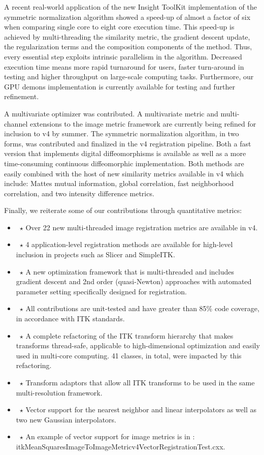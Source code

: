 \documentclass{frontiersSCNS}
\begin{document}
A recent real-world application of the new Insight ToolKit implementation of the symmetric normalization algorithm showed a speed-up of almost a factor of six when comparing single core to eight core execution time. This speed-up is achieved by multi-threading the similarity metric, the gradient descent update, the regularization terms and the composition components of the method. Thus, every essential step exploits intrinsic parallelism in the algorithm. Decreased execution time means more rapid turnaround for users, faster turn-around in testing and higher throughput on large-scale computing tasks.  Furthermore, our GPU demons implementation is currently available for testing and further refinement.

A multivariate optimizer was contributed. A multivariate metric and multi-channel extensions to the image metric framework are currently being refined for inclusion to v4 by summer. The symmetric normalization algorithm, in two forms, was contributed and finalized in the v4 registration pipeline. Both a fast version that implements digital diffeomorphisms is available as well as a more time-consuming continuous diffeomorphic implementation. Both methods are easily combined with the host of new similarity metrics available in v4 which include: Mattes mutual information, global correlation, fast neighborhood correlation, and two intensity difference metrics. 

Finally, we reiterate some of our contributions through quantitative metrics:
\begin{itemize}
\item~$\star$ Over 22 new multi-threaded image registration metrics are available in v4.
\item~$\star$ 4 application-level registration methods are available
  for high-level inclusion in projects such as Slicer and SimpleITK.
\item~$\star$ A new optimization framework that is multi-threaded and includes gradient descent and 2nd order (quasi-Newton) approaches with automated parameter setting specifically designed for registration.
\item~$\star$ All contributions are unit-tested and have greater than 85\% code coverage, in accordance with ITK standards.
\item~$\star$ A complete refactoring of the ITK transform hierarchy that makes transforms thread-safe, applicable to high-dimensional optimization and easily used in multi-core computing. 41 classes, in total, were impacted by this refactoring.

\item~$\star$ Transform adaptors that allow all ITK transforms to be used in the same multi-resolution framework. 

\item~$\star$ Vector support for the nearest neighbor and linear interpolators as well as two new Gaussian interpolators.
\item~$\star$ An example of vector support for image metrics is in : itkMeanSquaresImageToImageMetricv4VectorRegistrationTest.cxx.
\end{itemize}
\end{document}
